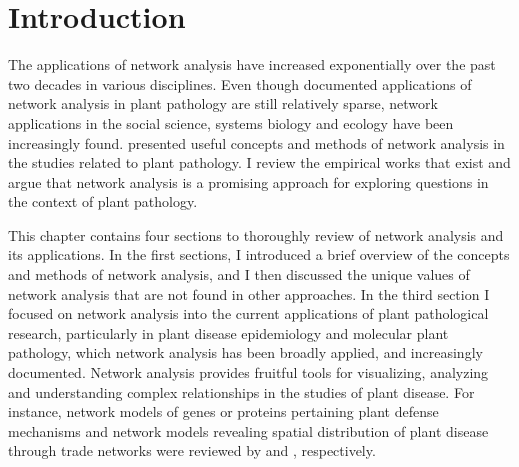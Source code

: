 \section*{Introduction}
\label{ch:intro}

The applications of network analysis have increased exponentially over the past two decades in various disciplines. Even though documented applications of network analysis in plant pathology are still relatively sparse, network applications in the social science, systems biology and ecology have been increasingly found.  presented useful concepts and methods of network analysis in the studies related to plant pathology. I review the empirical works that exist and argue that network analysis is a promising approach for exploring questions in the context of plant pathology.

% 
This chapter contains four sections to thoroughly review of network analysis and its applications. In the first sections, I introduced a brief overview of the concepts and methods of network analysis, and I then discussed the unique values of network analysis that are not found in other approaches. In the third section I focused on network analysis into the current applications of plant pathological research, particularly in plant disease epidemiology and molecular plant pathology, which network analysis has been broadly applied, and increasingly documented. Network analysis provides fruitful tools for visualizing, analyzing and understanding complex relationships in the studies of plant disease. For instance, network models of genes or proteins pertaining plant defense mechanisms and network models revealing spatial distribution of plant disease through trade networks were reviewed by  and , respectively.

